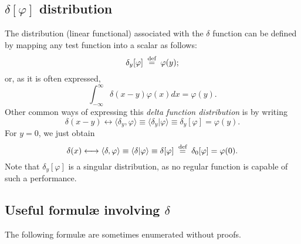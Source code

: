 \subsection{$\delta \left[ \varphi \right]$ distribution}

The distribution (linear functional) associated with the $\delta$ function
can be defined by mapping any test function into a scalar as follows:
\begin{equation}
\delta_y [\varphi ]\stackrel{{\tiny \textrm{ def }}}{=}\varphi (y);
\label{2018-m-ch-di-delta}
\end{equation}
or, as it is often expressed,
\begin{equation}
\int_{-\infty}^\infty
\delta(x-y) \varphi (x) dx = \varphi(y).
\end{equation}
Other common ways of expressing this {\em delta function distribution} is by writing
\begin{equation}
\delta(x-y) \longleftrightarrow
\langle \delta_y , \varphi \rangle \equiv
\langle \delta_y \vert \varphi \rangle \equiv
\delta_y [\varphi] = \varphi (y).
\end{equation}
For $y=0$, we just obtain
\begin{equation}
\delta(x) \longleftrightarrow
\langle \delta , \varphi \rangle \equiv
\langle \delta \vert \varphi \rangle \equiv
\delta [\varphi] \stackrel{{\tiny \textrm{ def }}}{=} \delta_0 [\varphi] =  \varphi (0).
\end{equation}
Note that $\delta_y[\varphi]$ is a singular distribution,
as no regular function is capable of such a performance.



\subsection{Useful formul\ae{} involving $\delta$}

The following formul\ae{} are sometimes enumerated without proofs.


